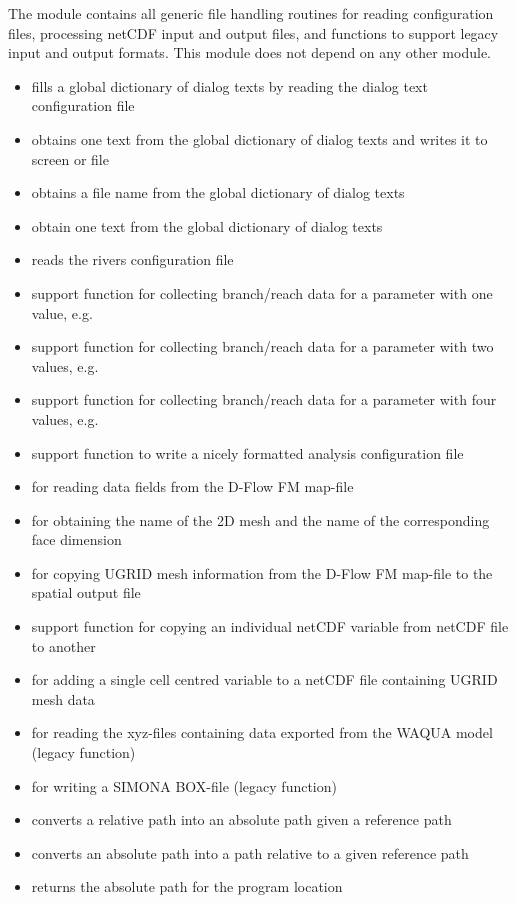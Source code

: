 The  module contains all generic file handling routines for reading configuration files, processing netCDF input and output files, and functions to support legacy input and output formats.
This module does not depend on any other \dfastmi module.

\begin{itemize}
\item {} fills a global dictionary of dialog texts by reading the dialog text configuration file
\item {} obtains one text from the global dictionary of dialog texts and writes it to screen or file
\item {} obtains a file name from the global dictionary of dialog texts
\item {} obtain one text from the global dictionary of dialog texts

\item {} reads the rivers configuration file
\item {} support function for collecting branch/reach data for a parameter with one value, e.g. 
\item {} support function for collecting branch/reach data for a parameter with two values, e.g. 
\item {} support function for collecting branch/reach data for a parameter with four values, e.g. 
\item {} support function to write a nicely formatted analysis configuration file

\item {} for reading data fields from the D-Flow FM map-file
\item {} for obtaining the name of the 2D mesh and the name of the corresponding face dimension
\item {} for copying UGRID mesh information from the D-Flow FM map-file to the spatial output file
\item {} support function for copying an individual netCDF variable from netCDF file to another
\item {} for adding a single cell centred variable to a netCDF file containing UGRID mesh data

\item {} for reading the xyz-files containing data exported from the WAQUA model (legacy function)
\item {} for writing a SIMONA BOX-file (legacy function)

\item {} converts a relative path into an absolute path given a reference path
\item {} converts an absolute path into a path relative to a given reference path
\item {} returns the absolute path for the program location
\end{itemize}


